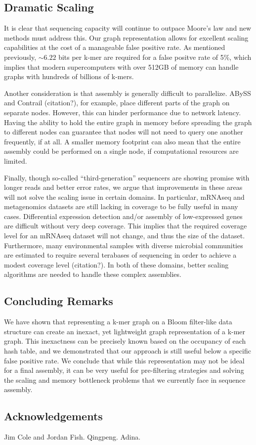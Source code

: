 \documentclass[12pt]{article} \usepackage{simplemargins}
\begin{document}
\subsection{Dramatic Scaling}
It is clear that sequencing capacity will continue to outpace Moore's 
law and new methods must address this. Our graph representation allows 
for excellent scaling capabilities at the cost of a manageable false positive rate. 
As mentioned previously, $\sim 6.22$ bits per k-mer are required for a 
false positve rate of 5\%, which implies that modern supercomputers with 
over 512GB of memory can handle graphs with hundreds of billions of k-mers.

Another consideration is that assembly is generally difficult to parallelize. 
ABySS and Contrail (citation?), for example, place different parts of the 
graph on separate nodes. However, this can hinder performance due to 
network latency. Having the ability to hold the entire graph in memory 
before spreading the graph to different nodes can guarantee that nodes 
will not need to query one another frequently, if at all. A smaller memory 
footprint can also mean that the entire assembly could be performed on 
a single node, if computational resources are limited.

Finally, though so-called ``third-generation'' sequencers are showing promise with 
longer reads and better error rates, we argue that improvements in these 
areas will not solve the scaling issue in certain domains. In particular, 
mRNAseq and metagenomics datasets are still lacking in coverage to be 
fully useful in many cases. Differential expression detection and/or assembly 
of low-expressed genes are difficult without very deep coverage. This implies 
that the required coverage level for an mRNAseq dataset will not change, 
and thus the size of the dataset. Furthermore, many environmental samples with 
diverse microbial communities are estimated to require several terabases of sequencing 
in order to achieve a modest coverage level (citation?). In both of these domains, better 
scaling algorithms are needed to handle these complex assemblies. 

\subsection{Concluding Remarks}
We have shown that representing a k-mer graph on a Bloom filter-like data 
structure can create an inexact, yet lightweight graph representation of 
a k-mer graph. This inexactness can be precisely known based on the occupancy 
of each hash table, and we demonstrated that our approach is still useful 
below a specific false positive rate. We conclude that while this representation 
may not be ideal for a final assembly, it can be very useful for pre-filtering 
strategies and solving the scaling and memory bottleneck problems that we 
currently face in sequence assembly.

\subsection{Acknowledgements}

Jim Cole and Jordan Fish.  Qingpeng.  Adina.



\end{document}

